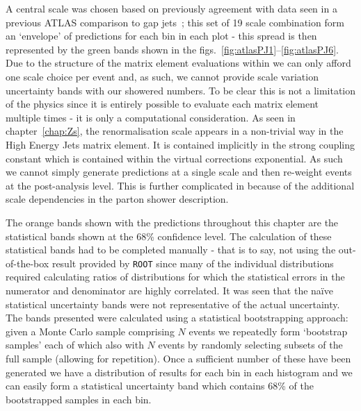 	A central scale was chosen based on previously agreement with data seen in a previous
	ATLAS comparison to gap jets~\cite{Aad:2011jz}; this set of 19 scale combination
	form an `envelope' of predictions for each bin in each plot - this spread is then
	represented by the green bands shown in the figs.~\eqref{fig:atlasPJ1}--\eqref{fig:atlasPJ6}.
	Due to the structure of the matrix element evaluations within \HEJA
	we can only afford one scale choice per event and, as such, we cannot provide
	scale variation uncertainty bands with our showered numbers.  To be clear this
	is not a limitation of the physics since it is entirely possible to evaluate
	each matrix element multiple times - it is only a computational consideration.
	As seen in chapter~\ref{chap:Zs}, the renormalisation scale appears in a non-trivial way
	in the High Energy Jets matrix element.  It is contained implicitly in the strong coupling
	constant which is contained within the virtual corrections exponential.  As such
	we cannot simply generate predictions at a single scale and then re-weight events
	at the post-analysis level.  This is further complicated in \HEJA because of the
	additional scale dependencies in the parton shower description.

	The orange bands shown with the \HEJA predictions throughout this chapter are the
	statistical bands shown at the 68\% confidence level.  The calculation
	of these statistical bands had to be completed manually - that is to say, not using
	the out-of-the-box result provided by \texttt{ROOT} since many of the individual
	distributions required calculating ratios of distributions for which the statistical
	errors in the numerator and denominator are highly correlated.  It was seen that the
	na\"ive statistical uncertainty bands were not representative of the actual uncertainty.
	The bands presented were calculated using a statistical bootstrapping approach: given
	a Monte Carlo sample comprising $N$ events we repeatedly form `bootstrap samples'
	each of which also with $N$ events by randomly selecting subsets of the full sample (allowing for
	repetition).  Once a sufficient number of these have been generated we have a distribution
	of results for each bin in each histogram and we can easily form a statistical
	uncertainty band which contains 68\% of the bootstrapped samples in each bin.

